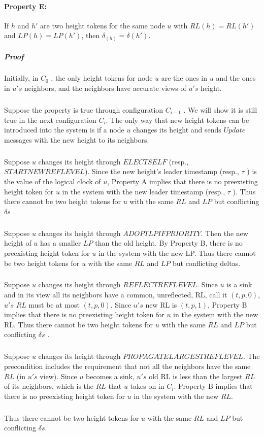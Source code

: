 \paragraph{Property E:}If $h$ and $h'$ are two height tokens for the same node $u$ with $RL(h) = RL(h')$ and $LP(h) = LP(h')$, then $\delta _(h) = \delta (h' )$.
\subparagraph{Proof}Initially, in $C_0$ , the only height tokens for node $u$ are the ones in $u$ and the ones in $u's$ neighbors, and the neighbors have accurate views of $u's$ height.
\subparagraph{}Suppose the property is true through configuration $C_{i-1}$ . We will show it is still true in the next configuration $C_i$. The only way that new height tokens can be introduced into the system is if a node $u$ changes its height and sends $Update$ messages with the new height to its neighbors.
\subparagraph{}Suppose $u$ changes its height through $ELECTSELF$ (resp., $STARTNEWREFLEVEL$). Since the new height's leader timestamp (resp., $\tau$ ) is the value of the logical clock of $u$, Property A implies that there is no preexisting height token for $u$ in the system with the new leader timestamp (resp., $\tau$ ). Thus there cannot be two height tokens for $u$ with the same $RL$ and $LP$ but conflicting $\delta s$ .
\subparagraph{}Suppose $u$ changes its height through $ADOPTLPIFPRIORITY$. Then the new height of $u$ has a smaller $LP$ than the old height. By Property B, there is no preexisting height token for $u$ in the system with the new LP. Thus there cannot be two height tokens for $u$ with the same $RL$ and $LP$ but conflicting deltas.
\subparagraph{}Suppose $u$ changes its height through $REFLECTREFLEVEL$. Since $u$ is a sink and in its view all its neighbors have a common, unreflected, RL, call it $(t, p, 0)$, $u's$ $RL$ must be at most $(t, p, 0)$. Since $u's$ new RL is $(t, p, 1)$, Property B implies that there is no preexisting height token for $u$ in the system with the new RL. Thus there cannot be two height tokens for $u$ with the same $RL$ and $LP$ but conflicting $\delta s$ . 
\subparagraph{}Suppose $u$ changes its height through $PROPAGATELARGESTREFLEVEL$. The precondition includes the requirement that not all the neighbors have the same $RL$ (in $u's$ view). Since $u$ becomes a sink, $u's$ old RL is less than the largest $RL$ of its neighbors, which is the $RL$ that $u$ takes on in $C_i$. Property B implies that there is no preexisting height token for $u$ in the system with the new $RL$. 
\subparagraph{}Thus there cannot be two height tokens for $u$ with the same $RL$ and $LP$ but conflicting $\delta s$.

